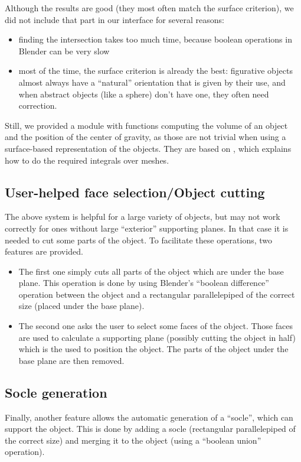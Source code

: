 \documentclass{report}
\begin{document}
	Although the results are good (they most often match the surface criterion), we did not include that part in our interface for several reasons:
	\begin{itemize}
		\item finding the intersection takes too much time, because boolean operations in Blender can be very slow
		\item most of the time, the surface criterion is already the best: figurative objects almost always have a “natural” orientation that is given by their use, and when abstract objects (like a sphere) don't have one, they often need correction.
	\end{itemize}

	Still, we provided a module with functions computing the volume of an object and the position of the center of gravity, as those are not trivial when using a surface-based representation of the objects. They are based on \cite{Liris-2411}, which explains how to do the required integrals over meshes.

\subsection{User-helped face selection/Object cutting}\label{sec:cutting}
The above system is helpful for a large variety of objects, but may not work correctly for ones without large ``exterior'' supporting planes. In that case it is needed to cut some parts of the object. To facilitate these operations, two features are provided.

\begin{itemize}
\item The first one simply cuts all parts of the object which are under the base plane. This operation is done by using Blender’s ``boolean difference'' operation between the object and a rectangular parallelepiped of the correct size (placed under the base plane).
\item The second one asks the user to select some faces of the object. Those faces are used to calculate a supporting plane (possibly cutting the object in half) which is the used to position the object. The parts of the object under the base plane are then removed.
\end{itemize}

\subsection{Socle generation}\label{sec:socle}
Finally, another feature allows the automatic generation of a “socle”, which can support the object. This is done by adding a socle (rectangular parallelepiped of the correct size) and merging it to the object (using a “boolean union” operation).
\end{document}
